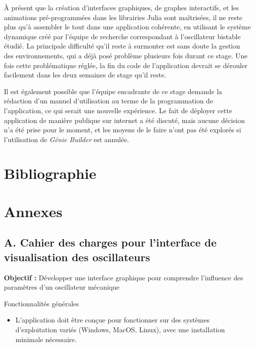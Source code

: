 \documentclass[a4paper, french, 12pt, titlepage]{article}
\begin{document}
À présent que la création d'interfaces graphiques, de graphes interactifs, et les animations pré-programmées dans les librairies Julia sont maîtrisées, il ne reste plus qu'à assembler le tout dans une application cohérente, en utilisant le système dynamique créé par l'équipe de recherche correspondant à l'oscillateur bistable étudié.
La principale difficulté qu'il reste à surmonter est sans doute la gestion des environnements, qui a déjà posé problème plusieurs fois durant ce stage.
Une fois cette problématique réglée, la fin du code de l'application devrait se dérouler facilement dans les deux semaines de stage qu'il reste. 

Il est également possible que l'équipe encadrante de ce stage demande la rédaction d'un manuel d'utilisation au terme de la programmation de l'application, ce qui serait une nouvelle expérience.
Le fait de déployer cette application de manière publique sur internet a été discuté, mais aucune décision n'a été prise pour le moment, et les moyens de le faire n'ont pas été explorés si l'utilisation de \emph{Génie Builder} est annulée.







\newpage

\section{Bibliographie}




\newpage

\listoffigures

\newpage

\section{Annexes}

\subsection*{A. Cahier des charges pour l'interface de visualisation des oscillateurs}


\textbf{Objectif :} Développer une interface graphique pour comprendre l'influence des paramètres d'un oscillateur mécanique

\large{Fonctionnalités générales}
\begin{itemize}
  \item L'application doit être conçue pour fonctionner sur des systèmes d'exploitation variés (Windows, MacOS, Linux), avec une installation minimale nécessaire.
\end{itemize}
\end{document}
